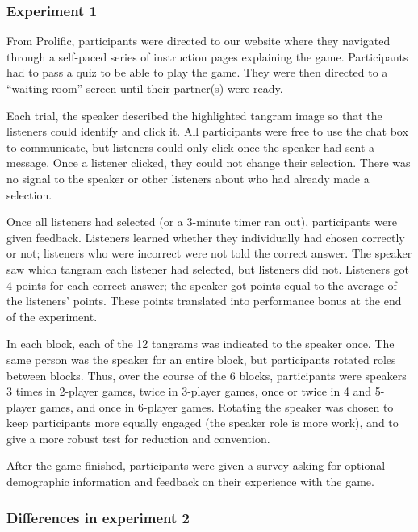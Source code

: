 \documentclass[
  english,
  a4paper,
]{article}
\begin{document}
\hypertarget{experiment-1}{%
\subsubsection{Experiment 1}\label{experiment-1}}

From Prolific, participants were directed to our website where they navigated through a self-paced series of instruction pages explaining the game. Participants had to pass a quiz to be able to play the game. They were then directed to a ``waiting room'' screen until their partner(s) were ready.

Each trial, the speaker described the highlighted tangram image so that the listeners could identify and click it. All participants were free to use the chat box to communicate, but listeners could only click once the speaker had sent a message. Once a listener clicked, they could not change their selection. There was no signal to the speaker or other listeners about who had already made a selection.

Once all listeners had selected (or a 3-minute timer ran out), participants were given feedback. Listeners learned whether they individually had chosen correctly or not; listeners who were incorrect were not told the correct answer. The speaker saw which tangram each listener had selected, but listeners did not. Listeners got 4 points for each correct answer; the speaker got points equal to the average of the listeners' points. These points translated into performance bonus at the end of the experiment.

In each block, each of the 12 tangrams was indicated to the speaker once. The same person was the speaker for an entire block, but participants rotated roles between blocks. Thus, over the course of the 6 blocks, participants were speakers 3 times in 2-player games, twice in 3-player games, once or twice in 4 and 5-player games, and once in 6-player games. Rotating the speaker was chosen to keep participants more equally engaged (the speaker role is more work), and to give a more robust test for reduction and convention.

After the game finished, participants were given a survey asking for optional demographic information and feedback on their experience with the game.

\hypertarget{differences-in-experiment-2}{%
\subsubsection{Differences in experiment 2}\label{differences-in-experiment-2}}
\end{document}

